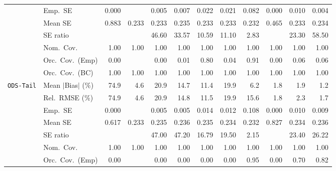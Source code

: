 \begin{landscape}
\begin{longtable}{llrrrrrrrrrr}
 & Emp.\ SE & 0.000 &  & 0.005 & 0.007 & 0.022 & 0.021 & 0.082 & 0.000 & 0.010 & 0.004 \\
 & Mean SE & 0.883 & 0.233 & 0.233 & 0.235 & 0.233 & 0.233 & 0.232 & 0.465 & 0.233 & 0.234 \\
 & SE ratio &  &  & 46.60 & 33.57 & \cellcolor{ranktwo}10.59 & \cellcolor{rankthree}11.10 & \cellcolor{rankone}2.83 &  & 23.30 & 58.50 \\
 & Nom.\ Cov. & \cellcolor{rankone}1.00 & \cellcolor{rankone}1.00 & \cellcolor{rankone}1.00 & \cellcolor{rankone}1.00 & \cellcolor{rankone}1.00 & \cellcolor{rankone}1.00 & \cellcolor{rankone}1.00 & \cellcolor{rankone}1.00 & \cellcolor{rankone}1.00 & \cellcolor{rankone}1.00 \\
 & Orc.\ Cov.\ (Emp) & 0.00 &  & 0.00 & 0.01 & \cellcolor{ranktwo}0.80 & 0.04 & \cellcolor{rankone}0.91 & 0.00 & \cellcolor{rankthree}0.06 & \cellcolor{rankthree}0.06 \\
 & Orc.\ Cov.\ (BC) & \cellcolor{rankone}1.00 & \cellcolor{rankone}1.00 & \cellcolor{rankone}1.00 & \cellcolor{rankone}1.00 & \cellcolor{rankone}1.00 & \cellcolor{rankone}1.00 & \cellcolor{rankone}1.00 & \cellcolor{rankone}1.00 & \cellcolor{rankone}1.00 & \cellcolor{rankone}1.00 \\
\addlinespace[2pt]
\quad \texttt{ODS-Tail} & Mean $|$Bias$|$ (\%) & 74.9 & 4.6 & 20.9 & 14.7 & 11.4 & 19.9 & 6.2 & \cellcolor{ranktwo}1.8 & \cellcolor{rankthree}1.9 & \cellcolor{rankone}1.2 \\
 & Rel.\ RMSE (\%) & 74.9 & 4.6 & 20.9 & 14.8 & 11.5 & 19.9 & 15.6 & \cellcolor{ranktwo}1.8 & \cellcolor{rankthree}2.3 & \cellcolor{rankone}1.7 \\
 & Emp.\ SE & 0.000 &  & 0.005 & 0.005 & 0.014 & 0.012 & 0.108 & 0.000 & 0.010 & 0.009 \\
 & Mean SE & 0.617 & 0.233 & 0.235 & 0.236 & 0.235 & 0.234 & 0.232 & 0.827 & 0.234 & 0.236 \\
 & SE ratio &  &  & 47.00 & 47.20 & \cellcolor{ranktwo}16.79 & \cellcolor{rankthree}19.50 & \cellcolor{rankone}2.15 &  & 23.40 & 26.22 \\
 & Nom.\ Cov. & \cellcolor{rankone}1.00 & \cellcolor{rankone}1.00 & \cellcolor{rankone}1.00 & \cellcolor{rankone}1.00 & \cellcolor{rankone}1.00 & \cellcolor{rankone}1.00 & \cellcolor{rankone}1.00 & \cellcolor{rankone}1.00 & \cellcolor{rankone}1.00 & \cellcolor{rankone}1.00 \\
 & Orc.\ Cov.\ (Emp) & 0.00 &  & 0.00 & 0.00 & 0.00 & 0.00 & \cellcolor{rankone}0.95 & 0.00 & \cellcolor{rankthree}0.70 & \cellcolor{ranktwo}0.82 \\

\end{longtable}
\end{landscape}

